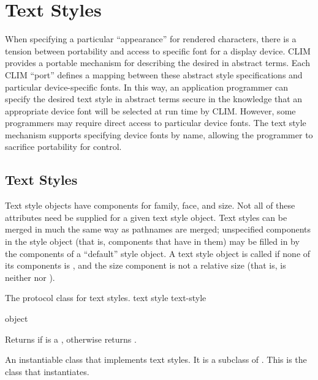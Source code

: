 
\chapter {Text Styles}
\label {text-styles}

When specifying a particular ``appearance'' for rendered characters, there is a
tension between portability and access to specific font for a display device.
CLIM provides a portable mechanism for describing the desired  in abstract terms.  Each CLIM ``port'' defines a mapping between these
abstract style specifications and particular device-specific fonts.  In this
way, an application programmer can specify the desired text style in abstract
terms secure in the knowledge that an appropriate device font will be selected
at run time by CLIM.  However, some programmers may require direct access to
particular device fonts.  The text style mechanism supports specifying device
fonts by name, allowing the programmer to sacrifice portability for control.


\section {Text Styles}

Text style objects have components for family, face, and size.  Not all of these
attributes need be supplied for a given text style object.  Text styles can be
merged in much the same way as pathnames are merged; unspecified components in
the style object (that is, components that have  in them) may be filled
in by the components of a ``default'' style object.  A text style object is
called  if none of its components is , and the
size component is not a relative size (that is, is neither  nor
).


The protocol class for text styles.
 {text style} {text-style}

 {object}

Returns  if  is a , otherwise returns
.


An instantiable class that implements text styles.  It is a subclass of
.  This is the class that  instantiates.
\Immutable

